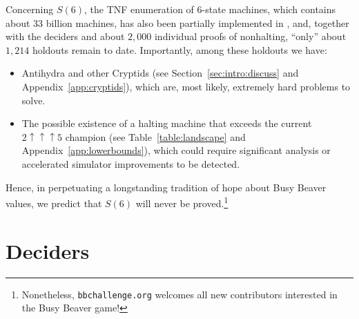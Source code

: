 \documentclass[sigconf,screen]{acmart}
\theoremstyle{definition} %
\numberwithin{equation}{section}
\theoremstyle{definition} %
\newcommand{\numBBsholdouts}{1{,}214}
\newcommand{\rado}{Rad\'o\xspace}
\begin{document}
Concerning $S(6)$, the TNF enumeration of 6-state machines, which contains about 33 billion machines, has also been partially implemented in \Coq, and, together with the deciders and about $2{,}000$ individual proofs of nonhalting, ``only'' about $\numBBsholdouts$ holdouts remain to date. Importantly, among these holdouts we have:
\begin{itemize}[label=--]
    \item Antihydra and other Cryptids (see Section~\ref{sec:intro:discuss} and Appendix~\ref{app:cryptids}), which are, most likely, extremely hard problems to solve.
    \item The possible existence of a halting machine that exceeds the current $2\uparrow\uparrow\uparrow5$ champion (see Table~\ref{table:landscape} and Appendix~\ref{app:lowerbounds}), which could require significant analysis or accelerated simulator improvements to be detected.
\end{itemize}


Hence, in perpetuating a longstanding tradition of hope about Busy Beaver values, we predict that $S(6)$ will never be proved.\footnote{Nonetheless, \texttt{bbchallenge.org} welcomes all new contributors interested in the Busy Beaver game!}




\newpage



\section{Deciders}\label{sec:deciders}
\end{document}
